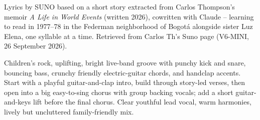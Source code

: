
\begin{notes}
Lyrics by SUNO based on a short story extracted from Carlos Thompson's memoir \emph{A Life in World Events} (written 2026), cowritten with Claude -- learning to read in 1977--78 in the Federman neighborhood of Bogotá alongside sister Luz Elena, one syllable at a time. Retrieved from Carlos Th's Suno page (V6-MINI, 26 September 2026).
\end{notes}
\begin{style}
Children's rock, uplifting, bright live-band groove with punchy kick and snare, bouncing bass, crunchy friendly electric-guitar chords, and handclap accents. Start with a playful guitar-and-clap intro, build through story-led verses, then open into a big easy-to-sing chorus with group backing vocals; add a short guitar-and-keys lift before the final chorus. Clear youthful lead vocal, warm harmonies, lively but uncluttered family-friendly mix.
\end{style}
